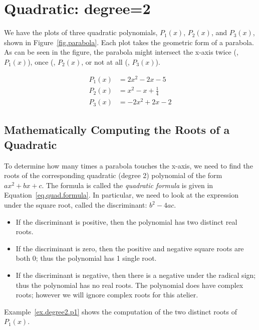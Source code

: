 \section{Quadratic: degree=2}
\label{sec.quadratic}



We have the plots of three quadratic polynomials, $P_1(x)$, $P_2(x)$, and $P_3(x)$, shown in Figure~\ref{fig.parabola}.
Each plot takes the geometric form of a parabola.  As can be seen in the figure,
the parabola might intersect the x-axis twice (\eg, $P_1(x)$), once (\eg, $P_2(x)$, or not at all (\eg, $P_3(x)$).

\begin{align*}
  P_1(x) &= 2x^2 - 2 x - 5\\
  P_2(x) &= x^2 -x + \frac{1}{4}\\
  P_3(x) &=  -2x^2 + 2x -2
\end{align*}


\subsection{Mathematically Computing the Roots of a Quadratic}

To determine how many times a parabola touches the x-axis, we need to
find the roots of the corresponding quadratic (degree 2) polynomial of
the form $a x^2 + b x + c$.  The formula is called the \emph{quadratic
formula} is given in Equation~\eqref{eq.quad.formula}.  In particular,
we need to look at the expression under the square root, called the
discriminant: $b^2 - 4a c$.
\begin{itemize}
\item If the discriminant is positive, then the polynomial has two
  distinct real roots.
\item If the discriminant is zero, then the positive and negative
  square roots are both 0; thus the polynomial has 1 single root.
\item If the discriminant is negative, then there is a negative under
  the radical sign; thus the polynomial has no real roots.  The
  polynomial does have complex roots; however we will ignore complex
  roots for this atelier.
\end{itemize}

Example~\ref{ex.degree2.p1} shows the computation of the two distinct roots of $P_1(x)$.

